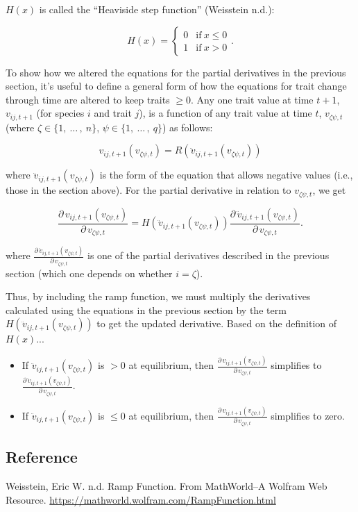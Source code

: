 \noindent $H(x)$ is called the ``Heaviside step function'' (Weisstein n.d.):

\begin{equation*}
    H(x) = \begin{cases}
        0 & \text{if}\ x \le 0 \\
        1 & \text{if}\ x > 0
        \end{cases}
    \text{.}
\end{equation*}



To show how we altered the equations for the partial derivatives
in the previous section, it's useful to define a general form of how
the equations for trait change through time are altered to keep traits $\ge 0$.
Any one trait value at time $t+1$,
$v_{ij,t+1}$ (for species $i$ and trait $j$),
is a function of any trait value at time $t$, $v_{\zeta\psi,t}$
(where $\zeta \in \{ 1, \: \ldots \, , \: n \}$,
$\psi \in \{ 1, \: \ldots \, , \: q \}$)
as follows:

\begin{equation*}
    v_{ij,t+1}(v_{\zeta\psi,t}) = R(\ddot{v}_{ij,t+1}(v_{\zeta\psi,t}))
\end{equation*}

\noindent where $\ddot{v}_{ij,t+1}(v_{\zeta\psi,t})$ is the form of the equation that
allows negative values (i.e., those in the section above).
For the partial derivative in relation to $v_{\zeta\psi,t}$, we get


\begin{equation*}
    \frac{\partial \, v_{ij,t+1}(v_{\zeta\psi,t})}{\partial \, v_{\zeta\psi,t}} =
        H(\ddot{v}_{ij,t+1}(v_{\zeta\psi,t}))
        \frac{\partial \, \ddot{v}_{ij,t+1}(v_{\zeta\psi,t})}{
            \partial \, v_{\zeta\psi,t} }
\text{.}
\end{equation*}

\noindent where
$\frac{\partial \, \ddot{v}_{ij,t+1}(v_{\zeta\psi,t})}{
\partial \, v_{\zeta\psi,t}}$
is one of the partial derivatives described in the previous section
(which one depends on whether $i = \zeta$).


Thus, by including the ramp function, we must multiply the derivatives
calculated using the equations in the previous section by the term
$H(\ddot{v}_{ij,t+1}(v_{\zeta\psi,t}))$ to get the updated derivative.
Based on the definition of $H(x)$...

\begin{itemize}
    \item If $\ddot{v}_{ij,t+1}(v_{\zeta\psi,t})$ is $> 0$ at equilibrium, then
        $\frac{\partial \, v_{ij,t+1}(v_{\zeta\psi,t})}{
            \partial \, v_{\zeta\psi,t}}$
        simplifies to $\frac{\partial \, \ddot{v}_{ij,t+1}(v_{\zeta\psi,t})}{
            \partial \, v_{\zeta\psi,t}}$.
    \item If $\ddot{v}_{ij,t+1}(v_{\zeta\psi,t})$ is $\le 0$ at equilibrium, then
        $\frac{\partial \, v_{ij,t+1}(v_{\zeta\psi,t})}{
            \partial \, v_{\zeta\psi,t}}$
        simplifies to zero.
\end{itemize}




\subsection*{Reference}

Weisstein, Eric W. n.d. Ramp Function.
From MathWorld--A Wolfram Web Resource.
\url{https://mathworld.wolfram.com/RampFunction.html}
